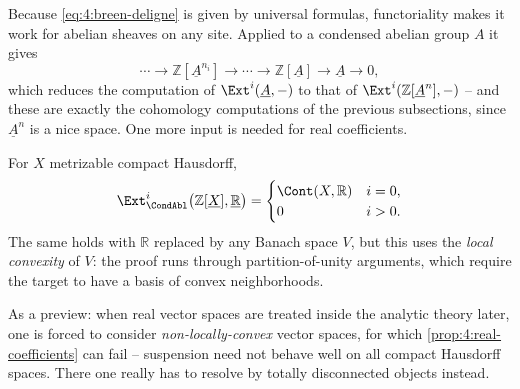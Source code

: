 Because \eqref{eq:4:breen-deligne} is given by universal formulas, functoriality
makes it work for abelian sheaves on any site. Applied to a condensed abelian
group $A$ it gives
\begin{equation}
\label{eq:4:breen-deligne-A}
\cdots\to\mathbb{Z}[\underline{A}^{n_i}]\to\cdots\to\mathbb{Z}[\underline{A}]\to
\underline{A}\to0,
\end{equation}
which reduces the computation of $\Ext^{i}(\underline{A},-)$ to that of
$\Ext^{i}(\mathbb{Z}[\underline{A}^{n}],-)$ -- and these are exactly the
cohomology computations of the previous subsections, since $\underline{A}^{n}$ is
a nice space. One more input is needed for real coefficients.

\begin{proposition}
\label{prop:4:real-coefficients}
For $X$ metrizable compact Hausdorff,
\begin{equation}
\label{eq:4:real-coefficients}
\Ext^{i}_{\CondAbl}\bigl(\mathbb{Z}[\underline{X}],\underline{\mathbb{R}}\bigr)=
\begin{cases}
\Cont(X,\mathbb{R}) & i=0,\\
0 & i>0.
\end{cases}
\end{equation}
The same holds with $\mathbb{R}$ replaced by any Banach space $V$, but this uses
the \emph{local convexity} of $V$: the proof runs through partition-of-unity
arguments, which require the target to have a basis of convex neighborhoods.
\end{proposition}

\begin{remark}
\label{rmk:4:non-convex-preview}
As a preview: when real vector spaces are treated inside the analytic theory
later, one is forced to consider \emph{non-locally-convex} vector spaces, for
which \cref{prop:4:real-coefficients} can fail -- suspension need not behave
well on all compact Hausdorff spaces. There one really has to resolve by totally
disconnected objects instead.
\end{remark}

